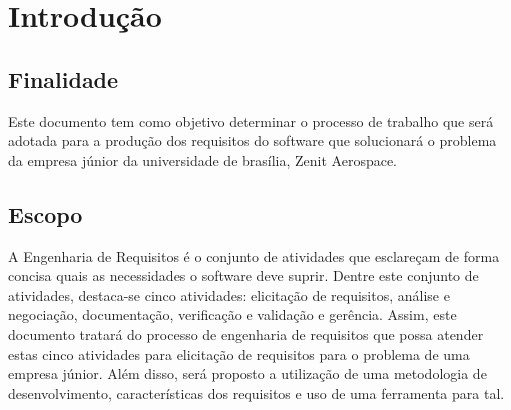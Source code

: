 \chapter[Introdução]{Introdução}


\section{Finalidade}
Este documento tem como objetivo determinar o processo de trabalho que será adotada para a produção dos requisitos do software que solucionará o problema da empresa júnior da universidade de brasília, Zenit Aerospace.
\section{Escopo}
A Engenharia de Requisitos é o conjunto de atividades que esclareçam de forma concisa quais as necessidades o software deve suprir. Dentre este conjunto de atividades, destaca-se cinco atividades: elicitação de requisitos, análise e negociação, documentação, verificação e validação e gerência. Assim, este documento tratará do processo de engenharia de requisitos que possa atender estas cinco atividades para elicitação de requisitos para o problema de uma empresa júnior. Além disso, será proposto a utilização de uma metodologia de desenvolvimento, características dos requisitos e uso de uma ferramenta para tal.

